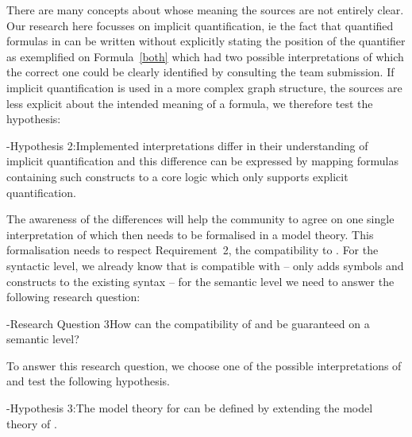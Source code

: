 There are many concepts about whose meaning the sources are not entirely clear. Our research here focusses on implicit quantification, ie the fact that quantified 
formulas in \nthree can be written without explicitly stating the position of the quantifier as exemplified on Formula~\ref{both} which had two possible interpretations of which
the correct one could be clearly identified by consulting the \wwwc team submission. If implicit quantification is used in a more complex graph structure, the sources are less 
explicit about the intended meaning of a formula, we therefore test the hypothesis:

\hyp{\hypertarget{h2}{Hypothesis 2:}}{Implemented interpretations differ in their understanding of implicit quantification and this difference can be 
expressed by mapping formulas containing such constructs to a core logic which only supports explicit quantification.}

The awareness of the differences will help the community to agree on one single interpretation of \nthreelogic which then needs to be formalised in a model theory. 
This formalisation needs to respect Requirement~2, the compatibility to \rdf. 
For the syntactic level, we already know that \nthree is compatible with \rdf -- \nthree only adds symbols and constructs to the existing \rdf syntax --
for the semantic level we need to answer the following research question:

\hyp{Research Question 3}{How can the compatibility of \nthreelogic and \rdf be guaranteed on a semantic level?}

To answer this research question, we choose one of the possible interpretations of \nthreelogic and test the following hypothesis.

\hyp{Hypothesis 3:}{The model theory for \nthree can be defined by extending the model theory of \rdf.}

